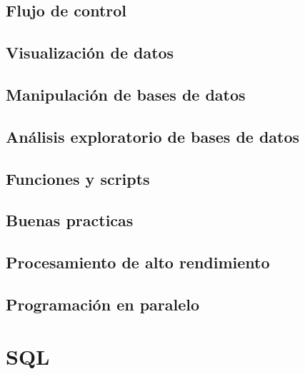 \documentclass[
]{book}
\begin{document}
\hypertarget{flujo-de-control}{%
\section{Flujo de control}\label{flujo-de-control}}

\hypertarget{visualizaciuxf3n-de-datos}{%
\section{Visualización de datos}\label{visualizaciuxf3n-de-datos}}

\hypertarget{manipulaciuxf3n-de-bases-de-datos}{%
\section{Manipulación de bases de datos}\label{manipulaciuxf3n-de-bases-de-datos}}

\hypertarget{anuxe1lisis-exploratorio-de-bases-de-datos}{%
\section{Análisis exploratorio de bases de datos}\label{anuxe1lisis-exploratorio-de-bases-de-datos}}

\hypertarget{funciones-y-scripts}{%
\section{Funciones y scripts}\label{funciones-y-scripts}}

\hypertarget{buenas-practicas}{%
\section{Buenas practicas}\label{buenas-practicas}}

\hypertarget{procesamiento-de-alto-rendimiento}{%
\section{Procesamiento de alto rendimiento}\label{procesamiento-de-alto-rendimiento}}

\hypertarget{programaciuxf3n-en-paralelo}{%
\section{Programación en paralelo}\label{programaciuxf3n-en-paralelo}}

\hypertarget{sql}{%
\chapter{SQL}\label{sql}}
\end{document}
